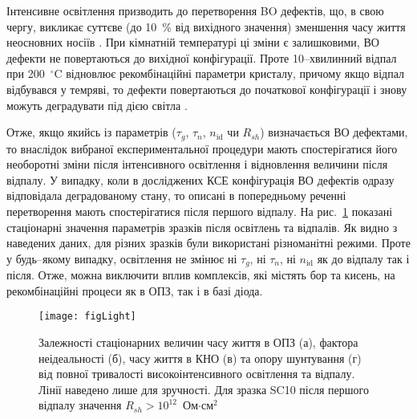Інтенсивне освітлення призводить до перетворення BO дефектів, що, в свою
чергу, викликає суттєве (до 10~\% від вихідного значення) зменшення часу життя неосновних носіїв \cite{LIDRev,LIDRev2}.
При кімнатній температурі ці зміни є залишковими, ВО дефекти не повертаються до вихідної конфігурації.
Проте 10--хвилинний відпал при 200~$^\circ$C відновлює рекомбінаційні параметри кристалу, причому
якщо відпал відбувався у темряві, то дефекти повертаються до початкової конфігурації і знову можуть деградувати під
дією світла \cite{BO:Halam2016,LIDRev2,Kim}.

Отже, якщо якийсь із параметрів ($\tau_g$, $\tau_n$, $n_{\mathrm{id}}$ чи $R_{sh}$) визначається ВО дефектами,
то внаслідок вибраної експериментальної процедури мають спостерігатися його необоротні зміни після інтенсивного освітлення і відновлення
величини після відпалу.
У випадку, коли в досліджених КСЕ конфігурація ВО дефектів одразу відповідала деградованому стану,
то описані в попередньому реченні перетворення мають спостерігатися після першого відпалу.
На рис.~\ref{figLight} показані стаціонарні значення параметрів зразків після освітлень та відпалів.
Як видно з наведених даних, для різних зразків були використані різноманітні режими.
Проте у будь--якому випадку, освітлення не змінює ні $\tau_g$, ні $\tau_n$, ні $n_{\mathrm{id}}$ як до
відпалу так і після.
Отже, можна виключити вплив комплексів, які містять бор та кисень, на рекомбінаційні процеси
як в ОПЗ, так і в базі діода.

\begin{figure}
\center
\texttt{[image: figLight]}
\caption{\label{figLight}
Залежності стаціонарних величин часу життя в ОПЗ (а),  фактора неідеальності (б), часу життя в КНО (в) та  опору шунтування (г) від
повної тривалості високоінтенсивного освітлення та відпалу.
Лінії наведено лише для зручності.
Для зразка SC10 після першого відпалу значення $R_{sh}>10^{12}$~Ом$\cdot$см$^2$
}%
\end{figure}


